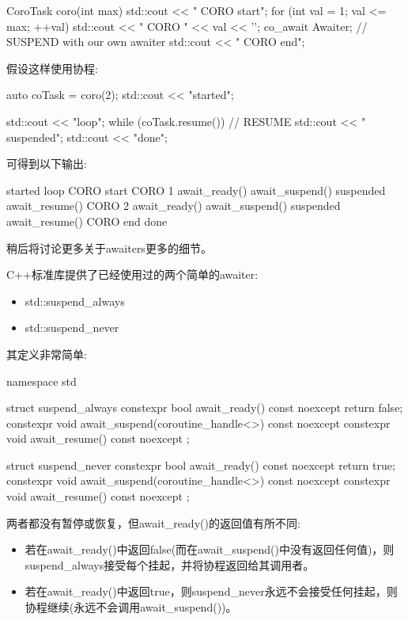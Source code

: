 \begin{cpp}
CoroTask coro(int max)
{
	std::cout << "   CORO start\n";
	for (int val = 1; val <= max; ++val) {
		std::cout << "   CORO " << val << '\n';
		co_await Awaiter{}; // SUSPEND with our own awaiter
	}
	std::cout << "   CORO end\n";
}
\end{cpp}

假设这样使用协程:

\begin{cpp}
auto coTask = coro(2);
std::cout << "started\n";

std::cout << "loop\n";
while (coTask.resume()) { // RESUME
	std::cout << " suspended\n";
}
std::cout << "done\n";
\end{cpp}

可得到以下输出:

\begin{shell}
started
loop
  CORO start
  CORO 1
    await_ready()
    await_suspend()
  suspended
    await_resume()
  CORO 2
    await_ready()
    await_suspend()
  suspended
    await_resume()
  CORO end
done
\end{shell}

稍后将讨论更多关于awaiters更多的细节。


C++标准库提供了已经使用过的两个简单的awaiter:

\begin{itemize}
\item
std::suspend\_always

\item
std::suspend\_never
\end{itemize}

其定义非常简单:

\begin{cpp}
namespace std {
	struct suspend_always {
		constexpr bool await_ready() const noexcept { return false; }
		constexpr void await_suspend(coroutine_handle<>) const noexcept { }
		constexpr void await_resume() const noexcept { }
	};

	struct suspend_never {
		constexpr bool await_ready() const noexcept { return true; }
		constexpr void await_suspend(coroutine_handle<>) const noexcept { }
		constexpr void await_resume() const noexcept { }
	};
}
\end{cpp}

两者都没有暂停或恢复，但await\_ready()的返回值有所不同:

\begin{itemize}
\item
若在await\_ready()中返回false(而在await\_suspend()中没有返回任何值)，则suspend\_always接受每个挂起，并将协程返回给其调用者。

\item
若在await\_ready()中返回true，则suspend\_never永远不会接受任何挂起，则协程继续(永远不会调用await\_suspend())。
\end{itemize}

